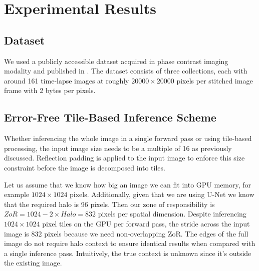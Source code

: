 \documentclass[runningheads]{llncs}
\begin{document}
\section{Experimental Results}
\label{experimental-results}

\subsection{Dataset}
\label{dataset}

We used a publicly accessible dataset acquired in phase contrast imaging modality and published in \cite{Bhadriraju2016}. 
The dataset consists of three collections, each with around 161 time-lapse images at roughly $\num{20000} \times \num{20000}$  pixels per stitched image frame with 2 bytes per pixels. 


\subsection{Error-Free Tile-Based Inference Scheme}

Whether inferencing the whole image in a single forward pass or using tile-based processing, the input image size needs to be a multiple of 16 as previously discussed. Reflection padding is applied to the input image to enforce this size constraint before the image is decomposed into tiles. 

Let us assume that we know how big an image we can fit into GPU memory, for example $1024 \times 1024$ pixels. Additionally, given that we are using U-Net we know that the required halo is 96 pixels. Then our zone of responsibility is $ZoR = 1024 - 2 \times Halo = 832$ pixels per spatial dimension. 
Despite inferencing $1024 \times 1024$ pixel tiles on the GPU per forward pass, the stride across the input image is 832 pixels because we need non-overlapping ZoR. 
The edges of the full image do not require halo context to ensure identical results when compared with a single inference pass. Intuitively, the true context is unknown since it's outside the existing image.
\end{document}
